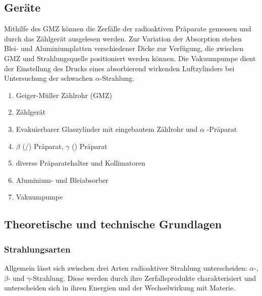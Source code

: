 \subsection{Geräte}
Mithilfe des GMZ können die Zerfälle der radioaktiven Präparate gemessen und durch das Zählgerät ausgelesen werden. Zur Variation der Absorption stehen Blei- und Aluminiumplatten verschiedener Dicke zur Verfügung, die zwischen GMZ und Strahlungsquelle positioniert werden können. Die Vakuumpumpe dient der Einstellung des Drucks eines absorbierend wirkenden Luftzylinders bei Untersuchung der schwachen \(\alpha\)-Strahlung.
\begin{enumerate}
    \item Geiger-Müller Zählrohr (GMZ)
    \item Zählgerät
    \item Evakuierbarer Glaszylinder mit eingebautem Zählrohr und \(\alpha\) -Präparat
    \item \(\beta\) (/) Präparat, \(\gamma\) () Präparat
    \item diverse Präparatehalter und Kollimatoren
    \item Aluminium- und Bleiabsorber
    \item Vakuumpumpe 
\end{enumerate}

\newpage

\subsection[Theoretische und technische Grundlagen]{Theoretische und technische Grundlagen \protect\autocite{Skript_2.2}}
\subsubsection{Strahlungsarten}
Allgemein lässt sich zwischen drei Arten radioaktiver Strahlung unterscheiden: \(\alpha\)-,\(\beta\)- und \(\gamma\)-Strahlung. Diese werden durch ihre Zerfallsprodukte charakterisiert und unterscheiden sich in ihren Energien und der Wechselwirkung mit Materie. 

